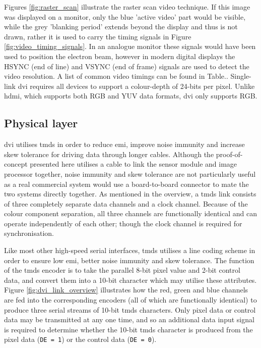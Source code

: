 Figures \ref{fig:raster_scan} illustrate the raster scan video technique. If this image was displayed on a monitor, only the blue 'active video' part would be visible, while the grey 'blanking period' extends beyond the display and thus is not drawn, rather it is used to carry the timing signals in Figure \ref{fig:video_timing_signals}. In an analogue monitor these signals would have been used to position the electron beam, however in modern digital displays the HSYNC (end of line) and VSYNC (end of frame) signals are used to detect the video resolution. A list of common video timings can be found in Table.. Single-link \gls{dvi} requires all devices to support a colour-depth of 24-bits per pixel. Unlike \gls{hdmi}, which supports both RGB and YUV data formats, \gls{dvi} only supports RGB.

\subsection{Physical layer}

\gls{dvi} utilises \gls{tmds} in order to reduce \gls{emi}, improve noise immunity and increase skew tolerance for driving data through longer cables. Although the proof-of-concept presented here utilises a cable to link the sensor module and image processor together, noise immunity and skew tolerance are not particularly useful as a real commercial system would use a board-to-board connector to mate the two systems directly together. As mentioned in the overview, a \gls{tmds} link consists of three completely separate data channels and a clock channel. Because of the colour component separation, all three channels are functionally identical and can operate independently of each other; though the clock channel is required for synchronisation.

Like most other high-speed serial interfaces, \gls{tmds} utilises a line coding scheme in order to ensure low \gls{emi}, better noise immunity and skew tolerance. The function of the \gls{tmds} encoder is to take the parallel 8-bit pixel value and 2-bit control data, and convert them into a 10-bit character which may utilise these attributes. Figure \ref{fig:dvi_link_overview} illustrates how the red, green and blue channels are fed into the corresponding encoders (all of which are functionally identical) to produce three serial streams of 10-bit \gls{tmds} characters. Only pixel data or control data may be transmitted at any one time, and so an additional data input signal is required to determine whether the 10-bit \gls{tmds} character is produced from the pixel data (\texttt{DE = 1}) or the control data (\texttt{DE = 0}). 

